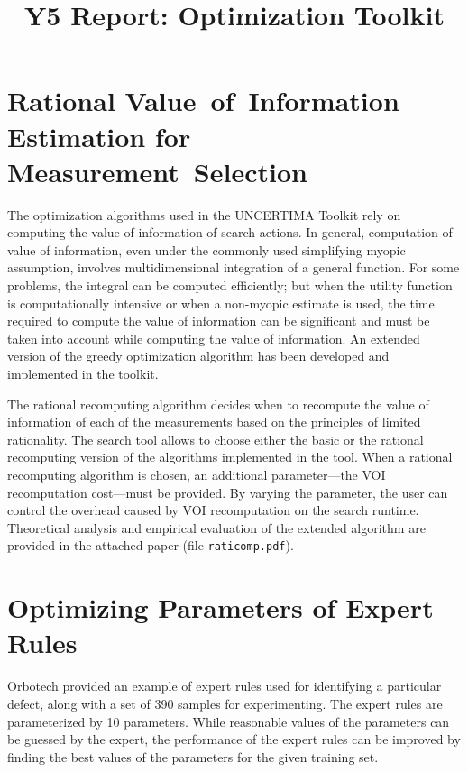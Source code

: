 \documentclass{article}
\author {}
\title{Y5 Report: Optimization Toolkit}
\begin{document}
\maketitle

\section{Rational Value~of~Information Estimation for
  Measurement~Selection}

The optimization algorithms used in the UNCERTIMA Toolkit rely on
computing the value of information of search actions. In general,
computation of value of information, even under the commonly used
simplifying myopic assumption, involves multidimensional integration
of a general function. For some problems, the integral can be computed
efficiently; but when the utility function is computationally
intensive or when a non-myopic estimate is used, the time required to
compute the value of information can be significant and must be taken
into account while computing the value of information. An extended
version of the greedy optimization algorithm has been developed and
implemented in the toolkit.

The rational recomputing algorithm decides when to recompute the value
of information of each of the measurements based on the principles of
limited rationality. The search tool allows to choose either the basic
or the rational recomputing version of the algorithms implemented in
the tool. When a rational recomputing algorithm is chosen, an
additional parameter---the VOI recomputation cost---must be
provided. By varying the parameter, the user can control the overhead
caused by VOI recomputation on the search runtime. Theoretical
analysis and empirical evaluation of the extended algorithm are
provided in the attached paper (file {\tt raticomp.pdf}).

\section{Optimizing Parameters of Expert Rules}
\label{sec:tuning-rules}

Orbotech provided an example of expert rules used for identifying a
particular defect, along with a set of 390 samples for
experimenting. The expert rules are parameterized by 10
parameters. While reasonable values of the parameters can be guessed
by the expert, the performance of the expert rules can be improved by
finding the best values of the parameters for the given training set.
\end{document}
